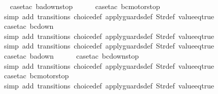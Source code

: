\begin{isabellebody}
\ \isamarkupfalse%
\ {\isacharparenleft}case{\isacharunderscore}tac\ {\isachardoublequoteopen}ba{\isacharequal}down{}{}stop{\isachardoublequoteclose}{\isacharparenright}\isanewline
\ \ \ \ \isamarkupfalse%
\ {\isacharparenleft}case{\isacharunderscore}tac\ {\isachardoublequoteopen}bc{\isacharequal}motorstop{}{\isachardoublequoteclose}{\isacharparenright}\isanewline
\ \ \ \ \ \isamarkupfalse%
\ {\isacharparenleft}simp\ add{\isacharcolon}\ transitions\ choice{\isacharunderscore}def\ apply{\isacharunderscore}guards{\isacharunderscore}def\ Str{\isacharunderscore}def\ value{\isacharunderscore}eq{\isacharunderscore}true{\isacharparenright}\isanewline
\ \ \ \ \isamarkupfalse%
\ {\isacharparenleft}case{\isacharunderscore}tac\ {\isachardoublequoteopen}bc{\isacharequal}down{}{}{\isachardoublequoteclose}{\isacharparenright}\isanewline
\ \ \ \ \ \isamarkupfalse%
\ {\isacharparenleft}simp\ add{\isacharcolon}\ transitions\ choice{\isacharunderscore}def\ apply{\isacharunderscore}guards{\isacharunderscore}def\ Str{\isacharunderscore}def\ value{\isacharunderscore}eq{\isacharunderscore}true{\isacharparenright}\isanewline
\ \ \isamarkupfalse%
\ {\isacharparenleft}simp\ add{\isacharcolon}\ transitions\ choice{\isacharunderscore}def\ apply{\isacharunderscore}guards{\isacharunderscore}def\ Str{\isacharunderscore}def\ value{\isacharunderscore}eq{\isacharunderscore}true{\isacharparenright}\isanewline
\ \isamarkupfalse%
\ {\isacharparenleft}case{\isacharunderscore}tac\ {\isachardoublequoteopen}ba{\isacharequal}down{}{}{\isachardoublequoteclose}{\isacharparenright}\isanewline
\ \ \ \ \isamarkupfalse%
\ {\isacharparenleft}case{\isacharunderscore}tac\ {\isachardoublequoteopen}bc{\isacharequal}down{}{}stop{\isachardoublequoteclose}{\isacharparenright}\isanewline
\ \ \ \ \ \isamarkupfalse%
\ {\isacharparenleft}simp\ add{\isacharcolon}\ transitions\ choice{\isacharunderscore}def\ apply{\isacharunderscore}guards{\isacharunderscore}def\ Str{\isacharunderscore}def\ value{\isacharunderscore}eq{\isacharunderscore}true{\isacharparenright}\isanewline
\ \ \ \ \isamarkupfalse%
\ {\isacharparenleft}case{\isacharunderscore}tac\ {\isachardoublequoteopen}bc{\isacharequal}motorstop{}{\isachardoublequoteclose}{\isacharparenright}\isanewline
\ \ \ \ \ \isamarkupfalse%
\ {\isacharparenleft}simp\ add{\isacharcolon}\ transitions\ choice{\isacharunderscore}def\ apply{\isacharunderscore}guards{\isacharunderscore}def\ Str{\isacharunderscore}def\ value{\isacharunderscore}eq{\isacharunderscore}true{\isacharparenright}\isanewline

\end{isabellebody}
